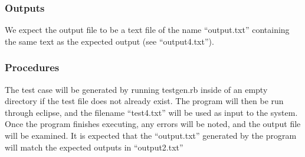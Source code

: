 \documentclass[]{article}
\begin{document}
	\subsubsection{Outputs}
	We expect the output file to be a text file of the name ``output.txt''
	containing the same text as the expected output (see ``output4.txt'').
	
	\subsubsection{Procedures}
	The test case will be generated by running testgen.rb inside of an empty
	directory if the test file does not already exist.  The program will then be
	run through eclipse, and the filename ``test4.txt'' will be used as input to
	the system.  Once the program finishes executing, any errors will be noted, and
	the output file will be examined.  It is expected that the ``output.txt''
	generated by the program will match the expected outputs in ``output2.txt'' 
	


\end{document}
